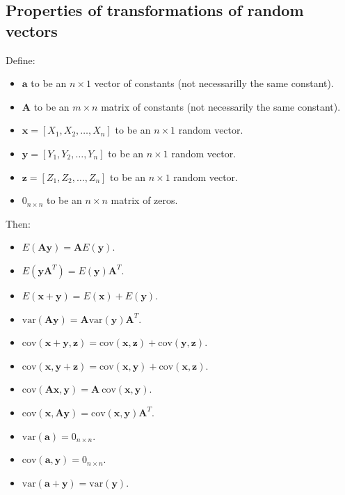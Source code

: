 \documentclass[
]{book}
\providecommand{\tightlist}{%
  \setlength{\itemsep}{0pt}\setlength{\parskip}{0pt}}
\theoremstyle{definition}
\theoremstyle{definition}
\theoremstyle{definition}
\theoremstyle{definition}
\theoremstyle{remark}
\begin{document}
\hypertarget{properties-of-transformations-of-random-vectors}{%
\subsection{Properties of transformations of random vectors}\label{properties-of-transformations-of-random-vectors}}

Define:

\begin{itemize}
\tightlist
\item
  \(\mathbf{a}\) to be an \(n\times 1\) vector of constants (not necessarilly the same constant).
\item
  \(\mathbf{A}\) to be an \(m\times n\) matrix of constants (not necessarily the same constant).
\item
  \(\mathbf{x}=[X_1,X_2,\ldots,X_n]\) to be an \(n\times 1\) random vector.
\item
  \(\mathbf{y}=[Y_1,Y_2,\ldots,Y_n]\) to be an \(n\times 1\) random vector.
\item
  \(\mathbf{z}=[Z_1,Z_2,\ldots,Z_n]\) to be an \(n\times 1\) random vector.
\item
  \(0_{n\times n}\) to be an \(n\times n\) matrix of zeros.
\end{itemize}

Then:

\begin{itemize}
\tightlist
\item
  \(E(\mathbf{A}\mathbf{y})=\mathbf{A}E(\mathbf{y})\).
\item
  \(E(\mathbf{y}\mathbf{A}^T )=E(\mathbf{y}) \mathbf{A}^T\).
\item
  \(E(\mathbf{x}+\mathbf{y})=E(\mathbf{x})+E(\mathbf{y})\).
\item
  \(\mathrm{var}(\mathbf{A}\mathbf{y})=\mathbf{A}\mathrm{var}(\mathbf{y}) \mathbf{A}^T\).
\item
  \(\mathrm{cov}(\mathbf{x}+\mathbf{y},\mathbf{z})=\mathrm{cov}(\mathbf{x},\mathbf{z})+\mathrm{cov}(\mathbf{y},\mathbf{z})\).
\item
  \(\mathrm{cov}(\mathbf{x},\mathbf{y}+\mathbf{z})=\mathrm{cov}(\mathbf{x},\mathbf{y})+\mathrm{cov}(\mathbf{x},\mathbf{z})\).
\item
  \(\mathrm{cov}(\mathbf{A}\mathbf{x},\mathbf{y})=\mathbf{A}\ \mathrm{cov}(\mathbf{x},\mathbf{y})\).
\item
  \(\mathrm{cov}(\mathbf{x},\mathbf{A}\mathbf{y})=\mathrm{cov}(\mathbf{x},\mathbf{y}) \mathbf{A}^T\).
\item
  \(\mathrm{var}(\mathbf{a})= 0_{n\times n}\).
\item
  \(\mathrm{cov}(\mathbf{a},\mathbf{y})=0_{n\times n}\).
\item
  \(\mathrm{var}(\mathbf{a}+\mathbf{y})=\mathrm{var}(\mathbf{y})\).
\end{itemize}
\end{document}
